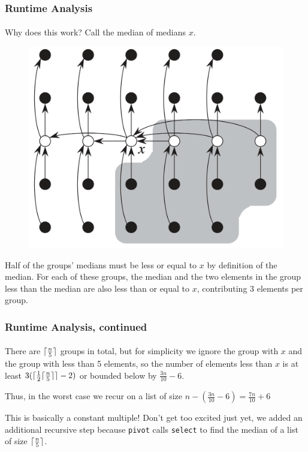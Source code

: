 \documentclass{beamer}                             %
\DeclarePairedDelimiter\ceil{\lceil}{\rceil}
\begin{document}
\begin{frame}
\frametitle{Runtime Analysis}
\framesubtitle{}
Why does this work? Call the median of medians \( x \).

\begin{figure}[h!]
  \centering
  \includegraphics[scale=0.15]{median_of_medians.png}
\end{figure}

Half of the groups' medians must be less or equal to \( x \) by definition
of the median. For each of these groups, the median and the two elements
in the group less than the median are also less than or equal to \( x \),
contributing 3 elements per group.
\end{frame}

\begin{frame}
\frametitle{Runtime Analysis, continued}
\framesubtitle{}
There are \( \ceil{\frac{n}{5}} \) groups in total, but for simplicity we ignore
the group with \( x \) and the group with less than 5 elements,
so the number of elements less than \( x \)
is at least \( 3 (\ceil{\frac{1}{2} \ceil{\frac{n}{5}}} - 2) \)
or bounded below by \( \frac{3n}{10} - 6 \). \pause

Thus, in the worst case we recur on a list of size
\( n - (\frac{3n}{10} - 6) = \frac{7n}{10} + 6 \) \pause

This is basically a constant multiple!
Don't get too excited just yet, we added an additional recursive step because
\texttt{pivot} calls \texttt{select} to find the median
of a list of size \( \ceil{\frac{n}{5}} \).
\end{frame}
\end{document}
